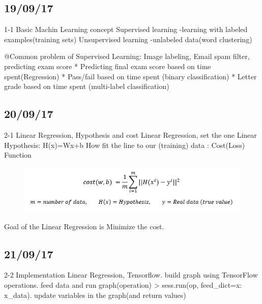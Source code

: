 \documentclass{article}
\begin{document}
\begin{CJK}{UTF8}{}
\subsection{19/09/17}
1-1 Basic Machin Learning concept\newline
Supervised learning -learning with labeled examples(training sets)\newline
Unsupervised learning -unlabeled data(word clustering)\newline

@Common problem of Supervised Learning: \newline
Image labeling, Email spam filter, predicting exam score\newline
*	Predicting final exam score based on time spent(Regression)\newline
*	Pass/fail based on time spent (binary classification)\newline
*	Letter grade based on time spent (multi-label classification)\newline

\subsection{20/09/17}
2-1 Linear Regression, Hypothesis and cost\newline
Linear Regression, set the one Linear Hypothesis:  H(x)=Wx+b\newline
How fit the line to our (training) data : Cost(Loss) Function\newline

\begin{figure}[h!]
\centering
\includegraphics[scale=0.6]{1.jpg}
\end{figure}


Goal of the Linear Regression is Minimize the cost.\newline

\subsection{21/09/17}
2-2 Implementation Linear Regression, Tensorflow.	build graph using TensorFlow operations.	feed data and run graph(operation) > sess.run(op, feed_dict={x: x_data}).	update variables in the graph(and return values)\newline


\end{CJK}
\end{document}
